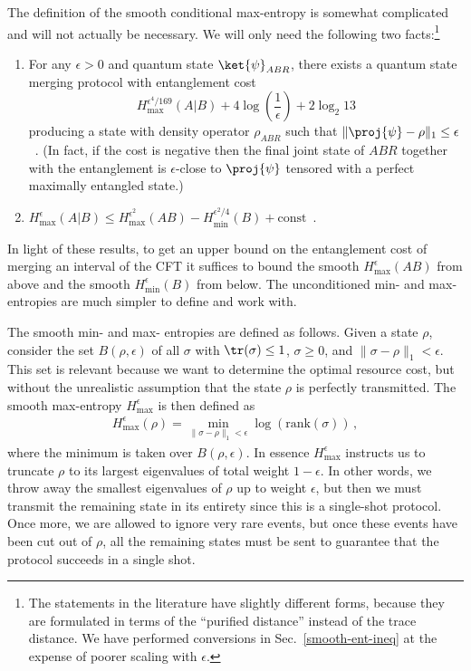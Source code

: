 \documentclass[12pt]{article}
\newcommand{\beq}{\begin{eqnarray}}
\newcommand{\eeq}{\end{eqnarray}}
\newcommand{\Hmax}{H_{\max}}
\newcommand{\Hmin}{H_{\min}}
\newcommand{\secref}[1]{Sec.~\ref{#1}}
\begin{document}
The definition of the smooth conditional max-entropy is somewhat complicated~\cite{oneshot,chain} and will not actually be necessary. We will only need the following two facts:\footnote{The statements in the literature have slightly different forms, because they are formulated in terms of the ``purified distance'' instead of the trace distance. We have performed conversions in \secref{smooth-ent-ineq} at the expense of poorer scaling with $\epsilon$.}
\begin{enumerate}
\item For any $\epsilon > 0$ and quantum state $\ket{\psi}_{ABR}$, there exists a quantum state merging protocol with entanglement cost
\begin{equation} \label{ub-single-shot}
\Hmax^{\epsilon^4/169}(A|B) + 4 \log\left(\frac{1}{\epsilon}\right) + 2 \log_2 13
\end{equation}
producing a state with density operator $\rho_{ABR}$ such that $\| \proj{\psi} - \rho \|_1 \leq \epsilon$~\cite{oneshot}. (In fact, if the cost is negative then the final joint state of $ABR$ together with the entanglement is $\epsilon$-close to $\proj{\psi}$ tensored with a perfect maximally entangled state.)
\item $\Hmax^\epsilon(A|B) \leq \Hmax^{\epsilon^2}(AB) - \Hmin^{\epsilon^2/4}(B) + \text{const}$~\cite{chain}.
\end{enumerate}
In light of these results, to get an upper bound on the entanglement cost of merging an interval of the CFT it suffices to bound the smooth $\Hmax^\epsilon(AB)$ from above and the smooth $\Hmin^\epsilon(B)$ from below. The unconditioned min- and max- entropies are much simpler to define and work with.

The smooth min- and max- entropies are defined as follows. Given a state $\rho$, consider the set $B(\rho,\epsilon)$ of all $\sigma$ with $\tr(\sigma)\leq 1$, $\sigma \geq 0 $, and $\|\sigma - \rho\|_1 < \epsilon$. This set is relevant because we want to determine the optimal resource cost, but without the unrealistic assumption that the state $\rho$ is perfectly transmitted. The smooth max-entropy $\Hmax^\epsilon$ is then defined as
\beq
\Hmax^\epsilon(\rho) = \min_{\|\sigma -\rho\|_1 < \epsilon} \log(\text{rank}(\sigma))\,,
\eeq
where the minimum is taken over $B(\rho,\epsilon)$. In essence $\Hmax^\epsilon$ instructs us to truncate $\rho$ to its largest eigenvalues of total weight $1-\epsilon$. In other words, we throw away the smallest eigenvalues of $\rho$ up to weight $\epsilon$, but then we must transmit the remaining state in its entirety since this is a single-shot protocol. Once more, we are allowed to ignore very rare events, but once these events have been cut out of $\rho$, all the remaining states must be sent to guarantee that the protocol succeeds in a single shot.
\end{document}
